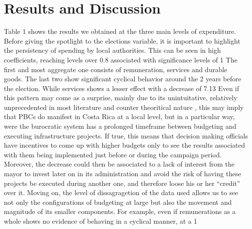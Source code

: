 \section{Results and Discussion}
	Table 1 shows the results we obtained at the three main levels of expenditure. Before giving the spotlight to the elections variable, it is important to highlight the persistency of spending by local authorities. This can be seen in high coefficients, reaching levels over 0.8 associated with significance levels of 1%
	The first and most aggregate one consists of remuneration, services and durable goods. The last two show significant cyclical behavior around the 2 years before the election. While services shows a lesser effect with a decrease of 7.13%
	Even if this pattern may come as a surprise, mainly due to its unintuitative, relatively unprecedented in most literature and counter theoritical nature \textcite{nordhaus1975}, this may imply that PBCs do manifest in Costa Rica at a local level, but in a particular way, were the burocratic system has a prolonged timeframe between budgeting and executing infrastructure projects. If true, this means that decision making officials have incentives to come up with higher budgets only to see the results associated with them being implemented just before or during the campaign period. Moreover, the decrease could then be associated to a lack of interest from the mayor to invest later on in its administration and avoid the risk of having these projects be executed during another one, and therefore loose his or her “credit” over it. 
	Moving on, the level of dissagragetion of the data used allows us to see not only the configurations of budgeting at large but also the movement and magnitude of its smaller components. For example, even if remunerations as a whole shows no evidence of behaving in a cyclical manner, at a 1%
